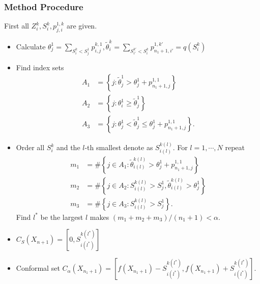 \documentclass[12pt, a4paper, oneside]{article}
\begin{document}
    \subsubsection{Method Procedure}
    First all $Z_i^k,S_i^k,p_{j,i}^{1,k}$ are given.
    \begin{itemize}
        \item Calculate $\theta_j^1=\overset{}{\underset{S_i^k<S_j^1}\sum}p_{i,j}^{k,1},\tilde{\theta}_i^k=\overset{}{\underset{S_{i'}^{k'}<S_i^k}\sum}p_{n_1+1,i'}^{1,k'}=q(S_i^k)$
        \item Find index sets
        \begin{align*}
            A_1&=\left\{ j:\tilde{\theta}_j^1>\theta_j^1+p_{n_1+1,j}^{1,1} \right\}\\
            A_2&=\left\{ j:\theta_i^1\geq\tilde{\theta}_j^1 \right\}\\
            A_3&=\left\{ j:\theta_j^1<\tilde{\theta}_j^1\leq\theta_j^1+p_{n_1+1,j}^{1,1} \right\}.
        \end{align*}
        \item Order all $S_i^k$ and the $l$-th smallest denote as $S_{i(l)}^{k(l)}$. For $l=1,\cdots,N$ repeat
        \begin{align*}
            m_1&=\#\left\{ j\in A_1:\tilde{\theta}_{i(l)}^{k(l)}>\theta_j^1+p_{n_1+1,j}^{1,1} \right\}\\
            m_2&=\#\left\{ j\in A_2:S_{i(l)}^{k(l)}>S_j^1,\tilde{\theta}_{i(l)}^{k(l)}>\theta_j^1 \right\}\\
            m_3&=\#\left\{ j\in A_3:S_{i(l)}^{k(l)}>S_j^1 \right\}.
        \end{align*}
        Find $l^*$ be the largest $l$ makes $(m_1+m_2+m_3)/(n_1+1)<\alpha$.
        \item $C_S(X_{n+1})=[0,S_{i(l^*)}^{k(l^*)}]$
        \item Conformal set $C_\alpha(X_{n_1+1})=[f(X_{n_1+1})-S_{i(l^*)}^{k(l^*)},f(X_{n_1+1})+S_{i(l^*)}^{k(l^*)}]$.
    \end{itemize}
\newpage


\end{document}
